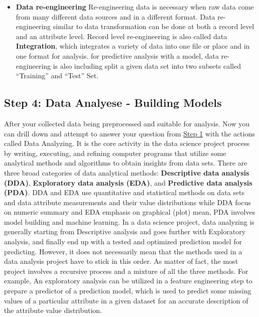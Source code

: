 \documentclass[
]{book}
\begin{document}
\begin{itemize}
\item
  \textbf{Data re-engineering}
  Re-engineering data is necessary when raw data come from many different data sources and in a different format. Data re-engineering similar to data transformation can be done at both a record level and an attribute level. Record level re-engineering is also called data \textbf{Integration}, which integrates a variety of data into one file or place and in one format for analysis. for predictive analysis with a model, data re-engineering is also including split a given data set into two subsets called ``Training'' and ``Test'' Set.
\end{itemize}

\hypertarget{analyse}{%
\subsection*{Step 4: Data Analyese - Building Models}\label{analyse}}


After your collected data being preprocessed and suitable for analysis. Now you can drill down and attempt to answer your question from \protect\hyperlink{step1}{Step 1} with the actions called Data Analyzing. It is the core activity in the data science project process by writing, executing, and refining computer programs that utilize some analytical methods and algorithms to obtain insights from data sets. There are three broad categories of data analytical methods: \textbf{Descriptive data analysis (DDA)}, \textbf{Exploratory data analysis (EDA)}, and \textbf{Predictive data analysis (PDA)}. DDA and EDA use
quantitative and statistical methods on data sets and data attribute measurements and their value distributions while DDA focus on numeric summary and EDA emphasis on graphical (plot) mean, PDA involves model building and machine learning.
In a data science project, data analyzing is generally starting from Descriptive analysis and goes further with Exploratory analysis, and finally end up with a tested and optimized prediction model for predicting. However, it does not necessarily mean that the methods used in a data analysis project have to stick in this order. As matter of fact, the most project involves a recursive process and a mixture of all the three methods. For example, An exploratory analysis can be utilized in a feature engineering step to prepare a predictor of a prediction model, which is used to predict some missing values of a particular attribute in a given dataset for an accurate description of the attribute value distribution.
\end{document}
